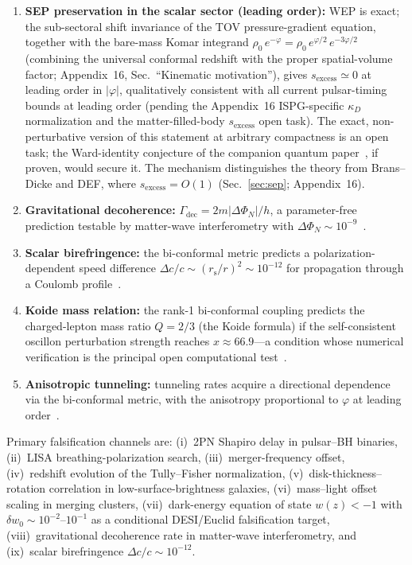 \documentclass[aps,prd,onecolumn,superscriptaddress,nofootinbib,showpacs,12pt]{revtex4-2}
\newcommand{\rs}{r_{\mathrm{s}}}
\begin{document}
\begin{enumerate}
\item \textbf{SEP preservation in the scalar sector
  (leading order):}
  WEP is exact; the sub-sectoral shift invariance of
  the TOV pressure-gradient equation, together with the
  bare-mass Komar integrand $\rho_0\,e^{-\varphi}
  =\rho_0\,e^{\varphi/2}\,e^{-3\varphi/2}$ (combining
  the universal conformal redshift with the proper
  spatial-volume factor; Appendix~16,
  Sec.~``Kinematic motivation''), gives
  $s_{\mathrm{excess}} \simeq 0$ at leading order in
  $|\varphi|$, qualitatively consistent with all current
  pulsar-timing bounds at leading order (pending the
  Appendix~16 ISPG-specific $\kappa_D$ normalization and
  the matter-filled-body $s_{\mathrm{excess}}$ open
  task).  The exact, non-perturbative
  version of this statement at arbitrary compactness is
  an open task; the Ward-identity conjecture of the
  companion quantum paper~\cite{Lotishvili2026Q}, if
  proven, would secure it.  The mechanism distinguishes
  the theory from Brans--Dicke and DEF, where
  $s_{\mathrm{excess}} = O(1)$ (Sec.~\ref{sec:sep};
  Appendix~16).

\item \textbf{Gravitational decoherence:}
  $\Gamma_{\mathrm{dec}} = 2m|\Delta\Phi_N|/h$, a
  parameter-free prediction testable by
  matter-wave interferometry with
  $\Delta\Phi_N \sim 10^{-9}$~\cite{Lotishvili2026Q}.

\item \textbf{Scalar birefringence:}
  the bi-conformal metric predicts a polarization-dependent
  speed difference $\Delta c/c \sim (\rs/r)^2 \sim
  10^{-12}$ for propagation through a Coulomb
  profile~\cite{Lotishvili2026Q}.

\item \textbf{Koide mass relation:}
  the rank-1 bi-conformal coupling predicts the
  charged-lepton mass ratio $Q = 2/3$ (the Koide
  formula) if the self-consistent oscillon perturbation
  strength reaches $x \approx 66.9$---a condition whose
  numerical verification is the principal open
  computational test~\cite{Lotishvili2026Q}.

\item \textbf{Anisotropic tunneling:}
  tunneling rates acquire a directional dependence
  via the bi-conformal metric, with the anisotropy
  proportional to $\varphi$ at leading
  order~\cite{Lotishvili2026Q}.
\end{enumerate}

Primary falsification channels are:
(i)~2PN Shapiro delay in pulsar--BH binaries,
(ii)~LISA breathing-polarization search,
(iii)~merger-frequency offset,
(iv)~redshift evolution of the Tully--Fisher normalization,
(v)~disk-thickness--rotation correlation in
  low-surface-brightness galaxies,
(vi)~mass--light offset scaling in merging clusters,
(vii)~dark-energy equation of state $w(z)<-1$ with
  $\delta w_0\sim 10^{-2}$--$10^{-1}$
  as a conditional DESI/Euclid falsification target,
(viii)~gravitational decoherence rate in
  matter-wave interferometry, and
(ix)~scalar birefringence $\Delta c/c\sim 10^{-12}$.
\end{document}
